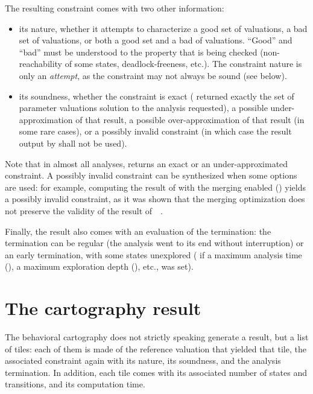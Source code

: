 The resulting constraint comes with two other information:
\begin{itemize}
	\item its nature, \ie{} whether it attempts to characterize a good set of valuations, a bad set of valuations, or both a good set and a bad of valuations.
	      ``Good'' and ``bad'' must be understood to the property that is being checked (non-reachability of some states, deadlock-freeness, etc.).
	      The constraint nature is only an \emph{attempt}, as the constraint may not always be sound (see below).
	\item its soundness, \ie{} whether the constraint is exact (\imitator{} returned exactly the set of parameter valuations solution to the analysis requested), a possible under-approximation of that result, a possible over-approximation of that result (in some rare cases), or a possibly invalid constraint (in which case the result output by \imitator{} shall not be used).
\end{itemize}
Note that in almost all analyses, \imitator{} returns an exact or an under-approximated constraint.
A possibly invalid constraint can be synthesized when some options are used: for example, computing the result of \IM{} with the merging enabled () yields a possibly invalid constraint, as it was shown that the merging optimization does not preserve the validity of the result of~\IM{}~\cite{AFS13atva}.

Finally, the result also comes with an evaluation of the termination: the termination can be regular (the analysis went to its end without interruption) or an early termination, with some states unexplored (\eg{} if a maximum analysis time (), a maximum exploration depth (), etc., was set).


\section{The cartography result}

The behavioral cartography does not strictly speaking generate a result, but a list of tiles: each of them is made of the reference valuation that yielded that tile, the associated constraint again with its nature, its soundness, and the analysis termination.
In addition, each tile comes with its associated number of states and transitions, and its computation time.



